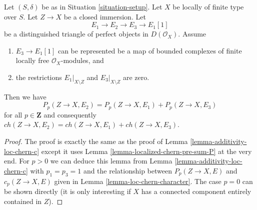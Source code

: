 \begin{lemma}
\label{lemma-additivity-loc-chern-P}
Let $(S, \delta)$ be as in Situation \ref{situation-setup}.
Let $X$ be locally of finite type over $S$. Let $Z \to X$ be
a closed immersion. Let
$$
E_1 \to E_2 \to E_3 \to E_1[1]
$$
be a distinguished triangle of perfect objects in $D(\mathcal{O}_X)$.
Assume
\begin{enumerate}
\item $E_3 \to E_1[1]$ can be represented be a map of bounded complexes
of finite locally free $\mathcal{O}_X$-modules, and
\item the restrictions $E_1|_{X \setminus Z}$ and $E_3|_{X \setminus Z}$
are zero.
\end{enumerate}
Then we have
$$
P_p(Z \to X, E_2) = P_p(Z \to X, E_1) + P_p(Z \to X, E_3)
$$
for all $p \in \mathbf{Z}$ and consequently
$ch(Z \to X, E_2) = ch(Z \to X, E_1) + ch(Z \to X, E_3)$.
\end{lemma}

\begin{proof}
The proof is exactly the same as the proof of
Lemma \ref{lemma-additivity-loc-chern-c}
except it uses
Lemma \ref{lemma-localized-chern-pre-sum-P}
at the very end. For $p > 0$ we can deduce this lemma
from Lemma \ref{lemma-additivity-loc-chern-c} with $p_1 = p_3 = 1$
and the relationship between $P_p(Z \to X, E)$ and $c_p(Z \to X, E)$ given in
Lemma \ref{lemma-loc-chern-character}. The case $p = 0$ can be shown
directly (it is only interesting if $X$ has a connected component
entirely contained in $Z$).
\end{proof}

